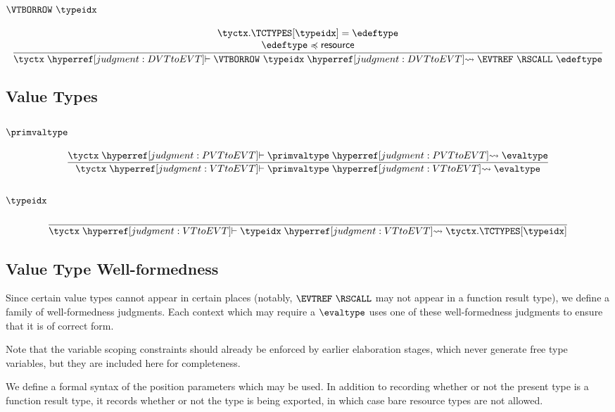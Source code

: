 \subsubsection{$\VTBORROW~\typeidx$}
\[
  \frac{
    \begin{array}{@{}c@{}}
    \tyctx.\TCTYPES[\typeidx] = \edeftype\\
    \edeftype \subtypeof \ESUBRESOURCE\\
    \end{array}
  }{
    \tyctx \vdashh!DVTtoEVT! \VTBORROW~\typeidx \leadstoh!DVTtoEVT! \EVTREF~\RSCALL~\edeftype
  }
\]

\subsection{Value Types}
\label{judgment:VTtoEVT}

\subsubsection{$\primvaltype$}
\[
  \frac{
    \tyctx \vdashh!PVTtoEVT! \primvaltype \leadstoh!PVTtoEVT! \evaltype
  }{
    \tyctx \vdashh!VTtoEVT! \primvaltype \leadstoh!VTtoEVT! \evaltype
  }
\]

\subsubsection{$\typeidx$}
\[
  \frac{
  }{
    \tyctx \vdashh!VTtoEVT! \typeidx \leadstoh!VTtoEVT! \tyctx.\TCTYPES[\typeidx]
  }
\]

\subsection{Value Type Well-formedness}
\label{judgment:EVT}

Since certain value types cannot appear in certain places (notably,
$\EVTREF~\RSCALL$ may not appear in a function result type), we define
a family of well-formedness judgments. Each context which may require
a $\evaltype$ uses one of these well-formedness judgments to ensure
that it is of correct form.

Note that the variable scoping constraints should already be enforced
by earlier elaboration stages, which never generate free type
variables, but they are included here for completeness.

We define a formal syntax of the position parameters which may be
used. In addition to recording whether or not the present type is a
function result type, it records whether or not the type is being
exported, in which case bare resource types are not allowed.

